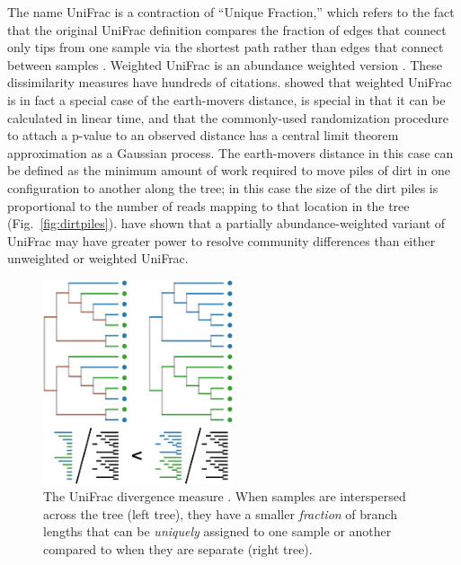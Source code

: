 \documentclass{amsart}
\newcommand{\forarxiv}[1]{#1}
\begin{document}
The name UniFrac is a contraction of ``Unique Fraction,'' which refers to the fact that the original UniFrac definition compares the fraction of edges that connect only tips from one sample via the shortest path rather than edges that connect between samples \citep[Fig.~\ref{fig:unifrac};][]{LozuponeKnightUniFrac05}.
Weighted UniFrac is an abundance weighted version \citep{LozuponeEaWeightedUnifrac07}.
These dissimilarity measures have hundreds of citations.
\citet{evans2012phylogenetic} showed that weighted UniFrac is in fact a special case of the earth-movers distance, is special in that it can be calculated in linear time, and that the commonly-used randomization procedure to attach a p-value to an observed distance has a central limit theorem approximation as a Gaussian process.
The earth-movers distance in this case can be defined as the minimum amount of work required to move piles of dirt in one configuration to another along the tree; in this case the size of the dirt piles is proportional to the number of reads mapping to that location in the tree (Fig.~\ref{fig:dirtpiles}).
\citet{chen2012associating} have shown that a partially abundance-weighted variant of UniFrac may have greater power to resolve community differences than either unweighted or weighted UniFrac.

\newcommand{\unifracLegend}{
    The UniFrac divergence measure \citep[figure adapted from][]{LozuponeKnightUniFrac05}.
    When samples are interspersed across the tree (left tree), they have a smaller \textit{fraction} of branch lengths that can be \textit{uniquely} assigned to one sample or another compared to when they are separate (right tree).
}
\forarxiv{
\begin{figure}
  \vspace{-26pt}
  \begin{center}
    \includegraphics[width=2.2in]{figures/unifrac.pdf}
  \end{center}
  \vspace{-10pt}
  \caption{\unifracLegend}
  \label{fig:unifrac}
\end{figure}
}
\end{document}
